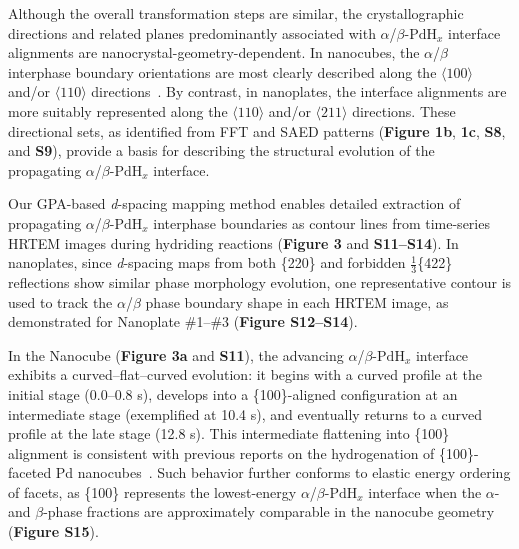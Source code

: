 \documentclass[reprint,amsmath,amssymb,aip,nofootinbib, citeautoscript,]{revtex4-2}
\begin{document}
Although the overall transformation steps are similar, the crystallographic directions and related planes predominantly associated with $\alpha$/$\beta$-$\mathrm{PdH}_x$ interface alignments are nanocrystal-geometry-dependent. In nanocubes, the $\alpha$/$\beta$ interphase boundary orientations are most clearly described along the $\langle100\rangle$ and/or $\langle 110 \rangle$ directions~\cite{lee_atomic_2024}. By contrast, in nanoplates, the interface alignments are more suitably represented along the $\langle 110 \rangle$ and/or $\langle 211 \rangle$ directions. These directional sets, as identified from FFT and SAED patterns (\textbf{Figure 1b}, \textbf{1c}, \textbf{S8}, and \textbf{S9}), provide a basis for describing the structural evolution of the propagating $\alpha$/$\beta$-$\mathrm{PdH}_x$ interface.


Our GPA-based \textit{d}-spacing mapping method enables detailed extraction of propagating $\alpha$/$\beta$-$\mathrm{PdH}_x$ interphase boundaries as contour lines from time-series HRTEM images during hydriding reactions (\textbf{Figure 3} and \textbf{S11–S14}). In nanoplates, since \textit{d}-spacing maps from both \{220\} and forbidden $\frac{1}{3}$\{422\} reflections show similar phase morphology evolution, one representative contour is used to track the $\alpha$/$\beta$ phase boundary shape in each HRTEM image, as demonstrated for Nanoplate \#1–\#3 (\textbf{Figure S12–S14}).


In the Nanocube (\textbf{Figure 3a} and \textbf{S11}), the advancing $\alpha$/$\beta$-$\mathrm{PdH}_x$ interface exhibits a curved–flat–curved evolution: it begins with a curved profile at the initial stage (0.0–0.8 s), develops into a \{100\}-aligned configuration at an intermediate stage (exemplified at 10.4 s), and eventually returns to a curved profile at the late stage (12.8 s). This intermediate flattening into \{100\} alignment is consistent with previous reports on the hydrogenation of \{100\}-faceted Pd nanocubes~\cite{narayan_direct_2017,lee_atomic_2024,sytwu_visualizing_2018}. Such behavior further conforms to elastic energy ordering of facets, as \{100\} represents the lowest-energy $\alpha$/$\beta$-$\mathrm{PdH}_x$ interface when the $\alpha$- and $\beta$-phase fractions are approximately comparable in the nanocube geometry~\cite{lee_atomic_2024} (\textbf{Figure S15}).
\end{document}
